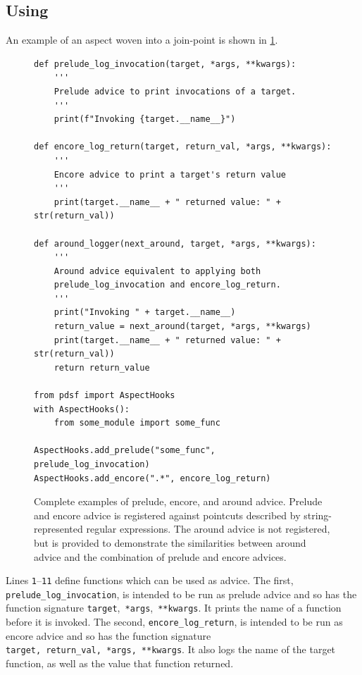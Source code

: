 \subsection{Using \pdsfthree{}}
\label{examples_of_using_pdsf}

An example of an aspect woven into a join-point is shown in
\cref{fig:registering_an_aspect_against_aspecthooks}.

\begin{figure}
    \begin{lstlisting}[style=footnotesize_python]
def prelude_log_invocation(target, *args, **kwargs):
    '''
    Prelude advice to print invocations of a target.
    '''
    print(f"Invoking {target.__name__}")
    
def encore_log_return(target, return_val, *args, **kwargs):
    '''
    Encore advice to print a target's return value
    '''
    print(target.__name__ + " returned value: " + str(return_val))
    
def around_logger(next_around, target, *args, **kwargs):
    '''
    Around advice equivalent to applying both
    prelude_log_invocation and encore_log_return.
    '''
    print("Invoking " + target.__name__)
    return_value = next_around(target, *args, **kwargs)
    print(target.__name__ + " returned value: " + str(return_val))
    return return_value

from pdsf import AspectHooks
with AspectHooks():
    from some_module import some_func

AspectHooks.add_prelude("some_func", prelude_log_invocation)
AspectHooks.add_encore(".*", encore_log_return)
    \end{lstlisting}
    \caption{Complete examples of prelude, encore, and around advice. Prelude
    and encore advice is registered against
    pointcuts described by string-represented regular expressions. The around
    advice is not registered, but is provided to demonstrate the similarities
    between around advice and the combination of prelude and encore advices.}
    \label{fig:registering_an_aspect_against_aspecthooks}
\end{figure}

Lines \texttt{1}--\texttt{11} define functions which can be used as
advice. The first, \lstinline{prelude_log_invocation}, is intended to be run as
prelude advice and so has the function signature
\lstinline{target},~\lstinline{*args},~\lstinline{**kwargs}. It prints the name
of a function before it is invoked. The second, \lstinline{encore_log_return},
is intended to be run as encore advice and so has the function signature
\lstinline{target,}~\lstinline{return_val,}~\lstinline{*args,}~\lstinline{**kwargs}.
It also logs the name of the target function, as well as the value that function
returned.


